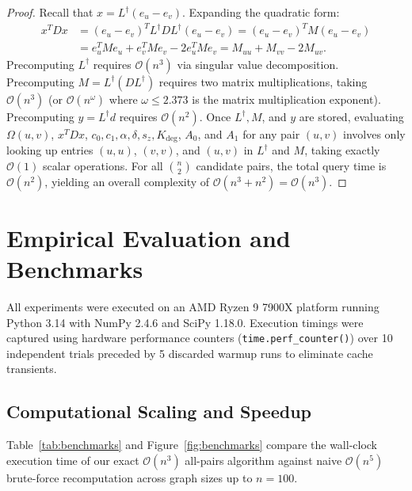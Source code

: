 \documentclass[11pt,a4paper]{article}
\theoremstyle{plain}
\theoremstyle{definition}
\begin{document}
\begin{proof}
Recall that $x = L^\dagger(e_u - e_v)$. Expanding the quadratic form:
\begin{align}
    x^T D x &= (e_u - e_v)^T L^\dagger D L^\dagger (e_u - e_v) = (e_u - e_v)^T M (e_u - e_v) \nonumber \\
    &= e_u^T M e_u + e_v^T M e_v - 2 e_u^T M e_v = M_{uu} + M_{vv} - 2 M_{uv}.
\end{align}
Precomputing $L^\dagger$ requires $\mathcal{O}(n^3)$ via singular value decomposition. Precomputing $M = L^\dagger (D L^\dagger)$ requires two matrix multiplications, taking $\mathcal{O}(n^3)$ (or $\mathcal{O}(n^\omega)$ where $\omega \le 2.373$ is the matrix multiplication exponent). Precomputing $y = L^\dagger d$ requires $\mathcal{O}(n^2)$.
Once $L^\dagger, M$, and $y$ are stored, evaluating $\Omega(u, v)$, $x^T D x$, $c_0, c_1, \alpha, \delta, s_z, K_{\mathrm{deg}}$, $A_0$, and $A_1$ for any pair $(u, v)$ involves only looking up entries $(u, u)$, $(v, v)$, and $(u, v)$ in $L^\dagger$ and $M$, taking exactly $\mathcal{O}(1)$ scalar operations. For all $\binom{n}{2}$ candidate pairs, the total query time is $\mathcal{O}(n^2)$, yielding an overall complexity of $\mathcal{O}(n^3 + n^2) = \mathcal{O}(n^3)$.
\end{proof}

\section{Empirical Evaluation and Benchmarks}
\label{sec:experiments}

All experiments were executed on an AMD Ryzen 9 7900X platform running Python 3.14 with NumPy 2.4.6 and SciPy 1.18.0. Execution timings were captured using hardware performance counters (\texttt{time.perf\_counter()}) over 10 independent trials preceded by 5 discarded warmup runs to eliminate cache transients.

\subsection{Computational Scaling and Speedup}
Table~\ref{tab:benchmarks} and Figure~\ref{fig:benchmarks} compare the wall-clock execution time of our exact $\mathcal{O}(n^3)$ all-pairs algorithm against naive $\mathcal{O}(n^5)$ brute-force recomputation across graph sizes up to $n = 100$.
\end{document}
